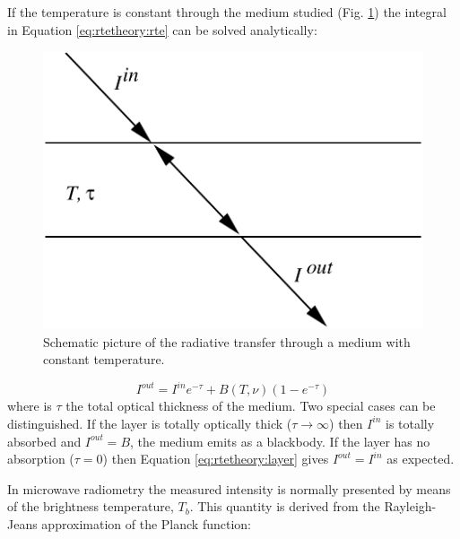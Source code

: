  If the temperature is constant through the medium studied (Fig.
 \ref{fig:rtetheory:layer}) the integral in Equation \ref{eq:rtetheory:rte} can be solved
 analytically:

 \begin{figure}
  \begin{center}
   \begin{minipage}[c]{0.4\textwidth}
    \centering
    \caption{Schematic picture of the radiative transfer through a medium with
             constant temperature.}
    \label{fig:rtetheory:layer}
   \end{minipage}%
   \hspace{0.05\textwidth}%
   \begin{minipage}[c]{0.50\textwidth}
    \centering
    \includegraphics*[width=0.99\hsize]{fig_layer}
   \end{minipage}
  \end{center}
 \end{figure}   
  
 \begin{equation}
   I^{out} = I^{in}e^{-\tau} + B(T,\nu)(1-e^{-\tau})
  \label{eq:rtetheory:layer}
 \end{equation}  
 where is $\tau$ the total optical thickness of the medium. Two
 special cases can be distinguished. If the layer is totally optically
 thick ($\tau \to \infty$) then $I^{in}$ is totally absorbed and
 $I^{out} = B$, the medium emits as a blackbody. If the layer has no
 absorption ($\tau=0$) then Equation \ref{eq:rtetheory:layer} gives
 $I^{out} = I^{in}$ as expected.
 
 In microwave radiometry the measured intensity is normally presented
 by means of the brightness temperature, $T_b$. This quantity is
 derived from the Rayleigh-Jeans approximation of the Planck function:

